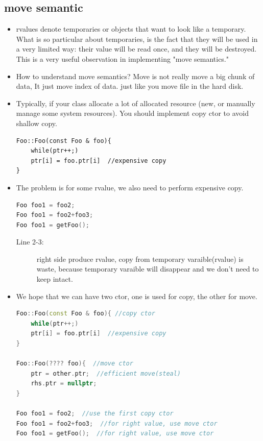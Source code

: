 \documentclass[a4paper,11pt,twoside]{book}
\begin{document}
\subsection{ move semantic}
\begin{itemize}
	
	\item rvalues denote temporaries or objects that want to look like a temporary. What is so particular about temporaries, is the fact that they will be used in a very limited way: their value will be read once, and they will be destroyed. This is a very useful observation in implementing "move semantics." 
	
	\item How to understand move semantics? Move is not really move a big chunk of data, It just move index of data. just like you move file in the hard disk. 
	
	
	\item Typically, if your class allocate a lot of allocated resource (new, or manually manage some system resources).  You should implement copy ctor to avoid shallow copy. 
\begin{lstlisting}[numbers=none]
Foo::Foo(const Foo & foo){
	while(ptr++;)
	ptr[i] = foo.ptr[i]  //expensive copy
}
\end{lstlisting}
	\item The problem is for some rvalue, we also need to perform expensive copy. 
\begin{lstlisting}[frame=single, language=c++]
Foo foo1 = foo2;
Foo foo1 = foo2+foo3;
Foo foo1 = getFoo();
\end{lstlisting}

\begin{description}
	\item[Line 2-3:] right side produce rvalue, copy from temporary varaible(rvalue) is waste, because temporary varaible will disappear and we don't need to keep intact. 
\end{description}


	\item We hope that we can have two ctor, one is used for copy, the other for move. 
\begin{lstlisting}[frame=single, language=c++]
Foo::Foo(const Foo & foo){ //copy ctor
	while(ptr++;)
	ptr[i] = foo.ptr[i]  //expensive copy
}	

Foo::Foo(???? foo){  //move ctor
	ptr = other.ptr;  //efficient move(steal)
	rhs.ptr = nullptr;
}	
	
Foo foo1 = foo2;  //use the first copy ctor
Foo foo1 = foo2+foo3;  //for right value, use move ctor
Foo foo1 = getFoo();  //for right value, use move ctor
\end{lstlisting}


\end{itemize}
\end{document}
